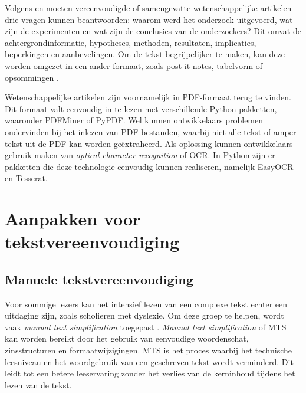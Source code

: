 \medspace

Volgens \textcite{Hollenkamp2020} en \textcite{McCombes2022} moeten vereenvoudigde of samengevatte wetenschappelijke artikelen drie vragen kunnen beantwoorden: waarom werd het onderzoek uitgevoerd, wat zijn de experimenten en wat zijn de conclusies van de onderzoekers? Dit omvat de achtergrondinformatie, hypotheses, methoden, resultaten, implicaties, beperkingen en aanbevelingen. Om de tekst begrijpelijker te maken, kan deze worden omgezet in een ander formaat, zoals post-it notes, tabelvorm of opsommingen \autocite{Rijkhoff2022}. 

\medspace

Wetenschappelijke artikelen zijn voornamelijk in PDF-formaat terug te vinden. Dit formaat valt eenvoudig in te lezen met verschillende Python-pakketten, waaronder PDFMiner of PyPDF. Wel kunnen ontwikkelaars problemen ondervinden bij het inlezen van PDF-bestanden, waarbij niet alle tekst of amper tekst uit de PDF kan worden geëxtraheerd. Als oplossing kunnen ontwikkelaars gebruik maken van \textit{optical character recognition} of OCR. In Python zijn er pakketten die deze technologie eenvoudig kunnen realiseren, namelijk EasyOCR en Tesserat.



\section{Aanpakken voor tekstvereenvoudiging}

\subsection{Manuele tekstvereenvoudiging}

Voor sommige lezers kan het intensief lezen van een complexe tekst echter een uitdaging zijn, zoals scholieren met dyslexie. Om deze groep te helpen, wordt vaak \textit{manual text simplification} toegepast \autocite{Siddharthan2014}. \textit{Manual text simplification} of MTS kan worden bereikt door het gebruik van eenvoudige woordenschat, zinsstructuren en formaatwijzigingen. MTS is het proces waarbij het technische leesniveau en het woordgebruik van een geschreven tekst wordt verminderd. Dit leidt tot een betere leeservaring zonder het verlies van de kerninhoud tijdens het lezen van de tekst.

